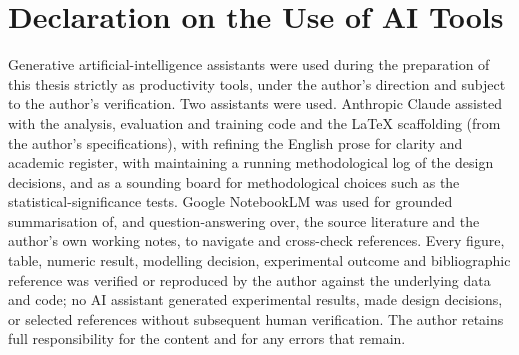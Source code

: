 \documentclass[twocolumn,twoside,a4paper,10pt]{IEEEtran}
\begin{document}
\section*{Declaration on the Use of AI Tools}

Generative artificial-intelligence assistants were used during the preparation of this thesis strictly as productivity tools, under the author's direction and subject to the author's verification. Two assistants were used. Anthropic Claude assisted with the analysis, evaluation and training code and the \LaTeX{} scaffolding (from the author's specifications), with refining the English prose for clarity and academic register, with maintaining a running methodological log of the design decisions, and as a sounding board for methodological choices such as the statistical-significance tests. Google NotebookLM was used for grounded summarisation of, and question-answering over, the source literature and the author's own working notes, to navigate and cross-check references. Every figure, table, numeric result, modelling decision, experimental outcome and bibliographic reference was verified or reproduced by the author against the underlying data and code; no AI assistant generated experimental results, made design decisions, or selected references without subsequent human verification. The author retains full responsibility for the content and for any errors that remain.





\end{document}
